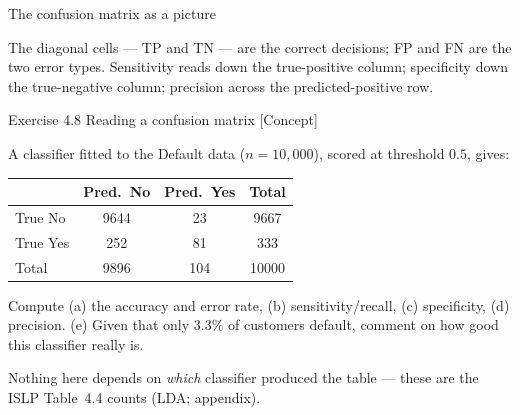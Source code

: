 \documentclass[aspectratio=169,11pt]{beamer}
\begin{document}
\begin{frame}{The confusion matrix as a picture}
  \begin{center}
  \end{center}
  \begin{takeaway}
    The diagonal cells --- TP and TN --- are the correct decisions; FP and
    FN are the two error types. Sensitivity reads down the true-positive
    column; specificity down the true-negative column; precision across the
    predicted-positive row.
  \end{takeaway}
\end{frame}


\begin{frame}{Exercise 4.8 \textemdash{} Reading a confusion matrix [Concept]}
\begin{exercise}
A classifier fitted to the Default data ($n=10{,}000$), scored at
threshold $0.5$, gives:
\begin{center}\small
\begin{tabular}{l|cc|c}
\toprule
 & Pred.\ No & Pred.\ Yes & Total \\
\midrule
True No  & 9644 & 23 & 9667 \\
True Yes & 252  & 81 & 333 \\
\midrule
Total & 9896 & 104 & 10000 \\
\bottomrule
\end{tabular}
\end{center}
Compute (a) the accuracy and error rate, (b) sensitivity/recall,
(c) specificity, (d) precision. (e) Given that only $3.3\%$ of
customers default, comment on how good this classifier really is.
\end{exercise}
{\scriptsize Nothing here depends on \emph{which} classifier produced the
table --- these are the ISLP Table~4.4 counts (LDA; appendix).}
\end{frame}
\end{document}
